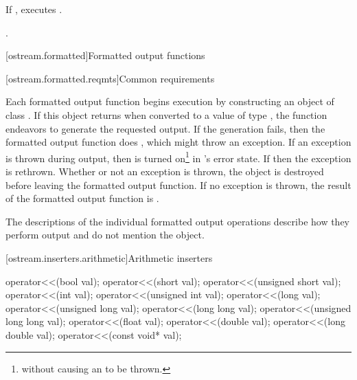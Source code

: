 \begin{itemdescr}
\pnum
\effects
If
,
executes
.

\pnum
\returns
{}.
\end{itemdescr}

[ostream.formatted]{Formatted output functions}

[ostream.formatted.reqmts]{Common requirements}

\pnum
Each formatted output function begins execution by constructing an object of class
.
If this object returns
when converted to a value of type
,
the function endeavors
to generate the requested output.
If the generation fails, then the formatted output function does
,
which might throw an exception.
If an exception is thrown during output, then
is turned on\footnote{without causing an
to be thrown.}
in
's
error state.
If
then the exception is rethrown.
Whether or not an exception is thrown, the
object is destroyed before leaving the formatted output function.
If no exception is thrown, the result of the formatted output function
is
.

\pnum
The descriptions of the individual formatted output operations
describe how they perform
output and do not mention the
object.

[ostream.inserters.arithmetic]{Arithmetic inserters}

%
\begin{itemdecl}
operator<<(bool val);
operator<<(short val);
operator<<(unsigned short val);
operator<<(int val);
operator<<(unsigned int val);
operator<<(long val);
operator<<(unsigned long val);
operator<<(long long val);
operator<<(unsigned long long val);
operator<<(float val);
operator<<(double val);
operator<<(long double val);
operator<<(const void* val);
\end{itemdecl}

